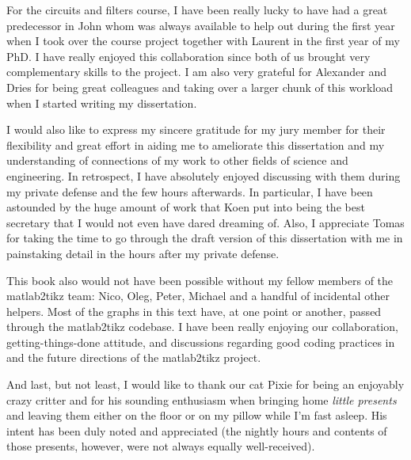 For the circuits and filters course, I have been really lucky to have had a great predecessor in John whom was always available to help out during the first year when I took over the course project together with Laurent in the first year of my PhD.
I have really enjoyed this collaboration since both of us brought very complementary skills to the project.
I am also very grateful for Alexander and Dries for being great colleagues and taking over a larger chunk of this workload when I started writing my dissertation.





I would also like to express my sincere gratitude for my jury member for their flexibility and great effort in aiding me to ameliorate this dissertation and my understanding of connections of my work to other fields of science and engineering.
In retrospect, I have absolutely enjoyed discussing with them during my private defense and the few hours afterwards.
In particular, I have been astounded by the huge amount of work that Koen put into being the best secretary that I would not even have dared dreaming of.
Also, I appreciate Tomas for taking the time to go through the draft version of this dissertation with me in painstaking detail in the hours after my private defense.

This book also would not have been possible without my fellow members of the matlab2tikz team: Nico, Oleg, Peter, Michael and a handful of incidental other helpers.
Most of the graphs in this text have, at one point or another, passed through the matlab2tikz codebase.
I have been really enjoying our collaboration, getting-things-done attitude, and discussions regarding good coding practices in \MATLAB{} and the future directions of the matlab2tikz project.


And last, but not least, I would like to thank our cat Pixie for being an enjoyably crazy critter and for his sounding enthusiasm when bringing home \emph{little presents} and leaving them either on the floor or on my pillow while I'm fast asleep.
His intent has been duly noted and appreciated (the nightly hours and contents of those presents, however, were not always equally well-received).
